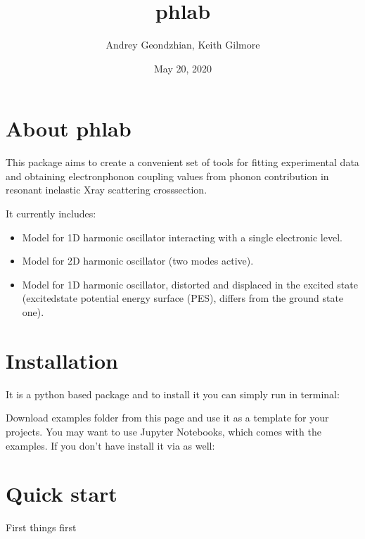 \documentclass[letterpaper,10pt,english]{sphinxmanual}
\title{phlab}
\date{May 20, 2020}
\author{Andrey Geondzhian, Keith Gilmore}
\begin{document}
\pagestyle{empty}
\sphinxmaketitle
\pagestyle{plain}
\sphinxtableofcontents
\pagestyle{normal}
\label{\detokenize{index::doc}}



\chapter{About phlab}
\label{\detokenize{about:about-phlab}}\label{\detokenize{about::doc}}
This package aims to create a convenient set of tools for fitting experimental data and obtaining electron\sphinxhyphen{}phonon coupling values from phonon contribution in resonant inelastic X\sphinxhyphen{}ray scattering cross\sphinxhyphen{}section.

It currently includes:
\begin{itemize}
\item {} 
Model for 1D harmonic oscillator interacting with a single electronic level.

\item {} 
Model for 2D harmonic oscillator (two modes active).

\item {} 
Model for 1D harmonic oscillator, distorted and displaced in the excited state (excited\sphinxhyphen{}state potential energy surface (PES), differs from the ground state one).

\end{itemize}


\chapter{Installation}
\label{\detokenize{installation:installation}}\label{\detokenize{installation::doc}}
It is a python based package and to install it you can simply run in terminal:


Download examples folder from this page and use it as a template for your projects. You may want to use Jupyter Notebooks, which comes with the examples. If you don’t have  install it  via  as well:



\chapter{Quick start}
\label{\detokenize{quickstart/index:quick-start}}\label{\detokenize{quickstart/index::doc}}
First things first
\end{document}
